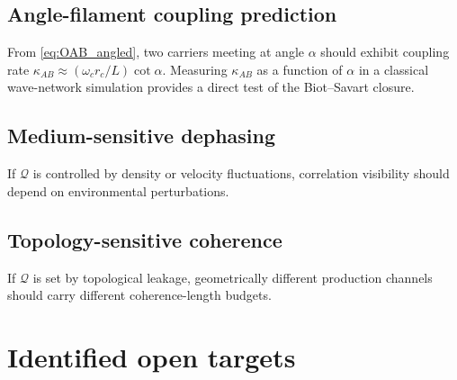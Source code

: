 \documentclass[11pt]{article}
\begin{document}
\subsection{Angle-filament coupling prediction}
From \cref{eq:OAB_angled}, two carriers meeting at angle $\alpha$ should exhibit coupling rate $\kappa_{AB} \approx (\omega_c r_c/L)\cot\alpha$. Measuring $\kappa_{AB}$ as a function of $\alpha$ in a classical wave-network simulation provides a direct test of the Biot--Savart closure.

\subsection{Medium-sensitive dephasing}
If $\mathcal{Q}$ is controlled by density or velocity fluctuations, correlation visibility should depend on environmental perturbations.

\subsection{Topology-sensitive coherence}
If $\mathcal{Q}$ is set by topological leakage, geometrically different production channels should carry different coherence-length budgets.

\section{Identified open targets}
\label{sec:open_targets}
\end{document}
